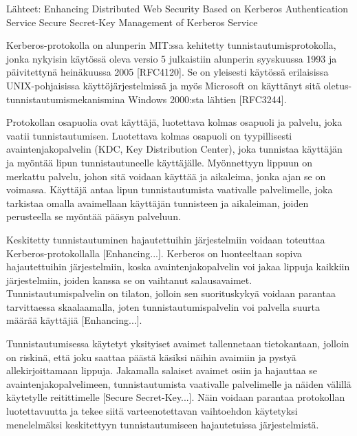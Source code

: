Lähteet: 
Enhancing Distributed Web Security Based on Kerberos Authentication Service
Secure Secret-Key Management of Kerberos Service

Kerberos-protokolla on alunperin MIT:ssa kehitetty tunnistautumisprotokolla, jonka nykyisin käytössä oleva versio 5 julkaistiin alunperin syyskuussa 1993 ja päivitettynä heinäkuussa 2005 [RFC4120]. Se on yleisesti käytössä erilaisissa UNIX-pohjaisissa käyttöjärjestelmissä ja myös Microsoft on käyttänyt sitä oletus-tunnistautumismekanismina Windows 2000:sta lähtien [RFC3244].

Protokollan osapuolia ovat käyttäjä, luotettava kolmas osapuoli ja palvelu, joka vaatii tunnistautumisen. Luotettava kolmas osapuoli on tyypillisesti avaintenjakopalvelin (KDC, Key Distribution Center), joka tunnistaa käyttäjän ja myöntää lipun tunnistautuneelle käyttäjälle. Myönnettyyn lippuun on merkattu palvelu, johon sitä voidaan käyttää ja aikaleima, jonka ajan se on voimassa. Käyttäjä antaa lipun tunnistautumista vaativalle palvelimelle, joka tarkistaa omalla avaimellaan käyttäjän tunnisteen ja aikaleiman, joiden perusteella se myöntää pääsyn palveluun.

Keskitetty tunnistautuminen hajautettuihin järjestelmiin voidaan toteuttaa Kerberos-protokollalla [Enhancing...]. Kerberos on luonteeltaan sopiva hajautettuihin järjestelmiin, koska avaintenjakopalvelin voi jakaa lippuja kaikkiin järjestelmiin, joiden kanssa se on vaihtanut salausavaimet. Tunnistautumispalvelin on tilaton, jolloin sen suorituskykyä voidaan parantaa tarvittaessa skaalaamalla, joten tunnistautumispalvelin voi palvella suurta määrää käyttäjiä [Enhancing...]. 

Tunnistautumisessa käytetyt yksityiset avaimet tallennetaan tietokantaan, jolloin on riskinä, että joku saattaa päästä käsiksi näihin avaimiin ja pystyä allekirjoittamaan lippuja. Jakamalla salaiset avaimet osiin ja hajauttaa se avaintenjakopalvelimeen, tunnistautumista vaativalle palvelimelle ja näiden välillä käytetylle reitittimelle [Secure Secret-Key...]. Näin voidaan parantaa protokollan luotettavuutta ja tekee siitä varteenotettavan vaihtoehdon käytetyksi menelelmäksi keskitettyyn tunnistautumiseen hajautetuissa järjestelmistä.
